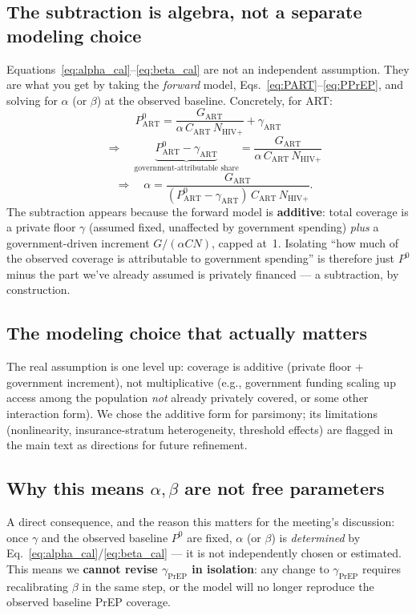 \documentclass[12pt]{article}
\begin{document}
\subsection{The subtraction is algebra, not a separate modeling choice}

Equations~\eqref{eq:alpha_cal}--\eqref{eq:beta_cal} are not an independent
assumption. They are what you get by taking the \emph{forward} model,
Eqs.~\eqref{eq:PART}--\eqref{eq:PPrEP}, and solving for $\alpha$ (or $\beta$)
at the observed baseline. Concretely, for ART:
\[
P_{\text{ART}}^{0} = \frac{G_{\text{ART}}}{\alpha\, C_{\text{ART}}\, N_{\text{HIV+}}} + \gamma_{\text{ART}}
\]
\[
\quad\Longrightarrow\quad
\underbrace{P_{\text{ART}}^{0} - \gamma_{\text{ART}}}_{\text{government-attributable share}}
= \frac{G_{\text{ART}}}{\alpha\, C_{\text{ART}}\, N_{\text{HIV+}}}
\]
\[
\quad\Longrightarrow\quad
\alpha = \frac{G_{\text{ART}}}{(P_{\text{ART}}^{0} - \gamma_{\text{ART}})\, C_{\text{ART}}\, N_{\text{HIV+}}}.
\]
The subtraction appears because the forward model is \textbf{additive}:
total coverage is a private floor $\gamma$ (assumed fixed, unaffected by
government spending) \emph{plus} a government-driven increment
$G/(\alpha C N)$, capped at~1. Isolating ``how much of the observed coverage
is attributable to government spending'' is therefore just $P^{0}$ minus the
part we've already assumed is privately financed --- a subtraction, by
construction.

\subsection{The modeling choice that actually matters}

The real assumption is one level up: coverage is additive
(private floor + government increment), not multiplicative (e.g., government
funding scaling up access among the population \emph{not} already privately
covered, or some other interaction form). We chose the additive form for
parsimony; its limitations (nonlinearity, insurance-stratum heterogeneity,
threshold effects) are flagged in the main text as directions for future
refinement.

\subsection{Why this means $\alpha,\beta$ are not free parameters}

A direct consequence, and the reason this matters for the meeting's
discussion: once $\gamma$ and the observed baseline $P^{0}$ are fixed,
$\alpha$ (or $\beta$) is \emph{determined} by
Eq.~\eqref{eq:alpha_cal}/\eqref{eq:beta_cal} --- it is not independently
chosen or estimated. This means we \textbf{cannot revise
$\gamma_{\text{PrEP}}$ in isolation}: any change to $\gamma_{\text{PrEP}}$
requires recalibrating $\beta$ in the same step, or the model will no
longer reproduce the observed baseline PrEP coverage.
\end{document}
